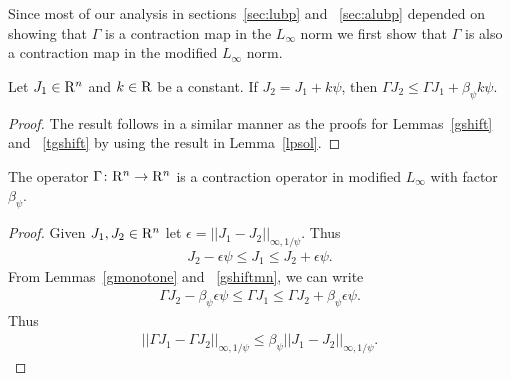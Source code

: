 Since most of our analysis in sections~\ref{sec:lubp} and ~\ref{sec:alubp} depended on showing that $\Gamma$ is a contraction map in the $L_\infty$ norm we first show that $\Gamma$ is also a contraction map in the modified $L_\infty$ norm.
\begin{lemma}\label{gshiftmn}
Let $J_1\in \mathrm{R}^n$ and $k\in \mathrm{R}$ be a constant. If $J_2=J_1+k\psi$, then $\Gamma J_2\leq \Gamma J_1+\beta_{\psi} k\psi$.
\end{lemma}
\begin{proof}
The result follows in a similar manner as the proofs for Lemmas~\ref{gshift} and ~\ref{tgshift} by using the result in Lemma~\ref{lpsol}.
\end{proof}
\begin{comment}
\begin{proof}
Choose any $i\in \{1,\ldots,n\}$, let $r^1_{e_i}$ and $r^2_{e_i}$ be solutions to the linear program in \eqref{lubplp} for $c=e_i$ with $J=J_1$ and $J=J_2$ respectively. By Assumption~\ref{one} and Lemma~\ref{shift}, we know that $r^1_{e_i}+\beta_{\psi} k \psi$ is feasible for the $i^{th}$ linear program associated with $\Gamma J_2$ and it follows that 
\begin{align}\label{inequality}
(\Phi r^2_{e_i})(i)&\leq(\Phi r^1_{e_i}(i)+\beta_{\psi} k\psi)(i), \mb\forall i \in \{1,\ldots,n\},\\ \mb &\text{since $i$ was arbitrary}.\nn
\end{align}
The proof follows by noting the fact that $(\Gamma J_2)(i)=(\Phi r^2_{e_i})(i)$.
\end{proof}
\end{comment}
\begin{theorem}\label{gmaxcontramn}
The operator $\Gamma  \colon \mathrm{R}^n\rightarrow \mathrm{R}^n$ is a contraction operator in modified $L_\infty$ with factor $\beta_{\psi}$.
\end{theorem}
\begin{proof}
Given $J_1,J_2\in \mathrm{R}^n$ let $\epsilon=||J_1-J_2||_{\infty,1/\psi}$. Thus
\begin{align}\label{ineq}
J_2-\epsilon\psi\leq J_1\leq J_2+\epsilon \psi.
\end{align}
From Lemmas~\ref{gmonotone} and ~\ref{gshiftmn}, we can write
\begin{align}\label{ineq}
\Gamma J_2-\beta_{\psi} \epsilon\psi\leq \Gamma J_1\leq \Gamma J_2+\beta_{\psi} \epsilon\psi.
\end{align}
Thus
\begin{align}
||\Gamma J_1-\Gamma J_2||_{\infty,1/\psi}\leq \beta_{\psi} ||J_1-J_2||_{\infty,1/\psi}.
\end{align}
\end{proof}
